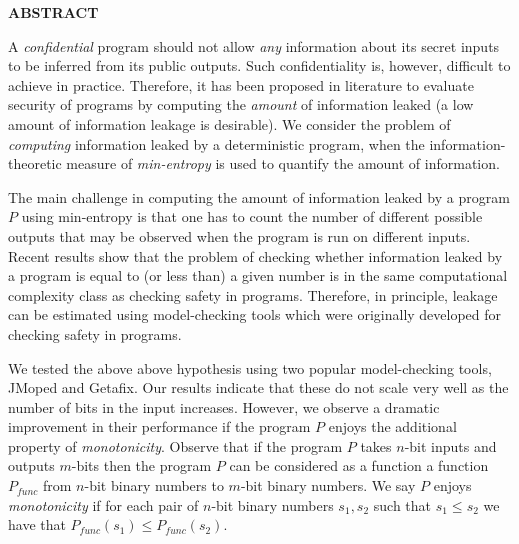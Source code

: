 \newpage
{}

\centerline{\bf \large ABSTRACT}
\vskip 10mm 

A \emph{confidential} program should not allow \emph{any} information about its secret inputs to be inferred from its public outputs. Such confidentiality is, however, difficult to achieve in practice. Therefore, it has been proposed in literature to evaluate security of programs by computing the \emph{amount} of information leaked (a low amount of information leakage is desirable). 
We consider the problem of \emph{computing} 
information leaked by a deterministic  program,  when the information-theoretic measure of \emph{min-entropy} is used to quantify the amount of information. 

The main challenge in computing the amount of  information leaked by a program $P$ using min-entropy is that one has to count the number of different possible outputs that may be observed when the program is run on different inputs. Recent results show that the problem of checking whether information leaked by a program is equal to  (or less than) a given number is in the same computational complexity class as checking safety in  programs.  Therefore, in principle,   leakage can be estimated using model-checking tools which were  originally developed for checking safety in programs.  
 
We tested the above above hypothesis using two popular model-checking tools, JMoped and Getafix. Our results indicate that these   do not scale very well as  the number of bits
in the input increases.  However, we observe a dramatic improvement in their performance  if the program $P$ enjoys the additional property of \emph{monotonicity}. Observe that if the program $P$ takes $n$-bit inputs and outputs $m$-bits then the program $P$ can be considered as a function a function $P_{func}$ from $n$-bit binary numbers to $m$-bit binary numbers.    We say $P$ enjoys   
\emph{monotonicity}  if for each pair of $n$-bit  binary numbers $s_1, s_2$  such that  $s_1\leq s_2$ we have that $P_{func}(s_1) \leq P_{func}(s_2).$


  